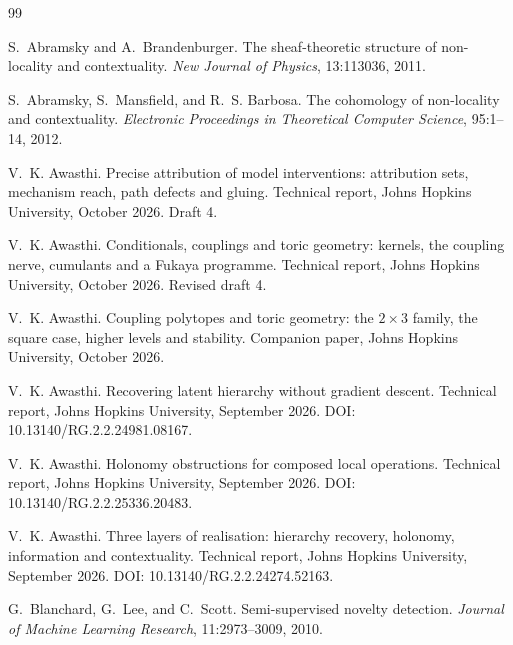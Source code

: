 \documentclass[11pt]{article}
\theoremstyle{definition}
\theoremstyle{remark}
\begin{document}
\begin{thebibliography}{99}

S.~Abramsky and A.~Brandenburger.
\newblock The sheaf-theoretic structure of non-locality and contextuality.
\newblock \emph{New Journal of Physics}, 13:113036, 2011.

S.~Abramsky, S.~Mansfield, and R.~S. Barbosa.
\newblock The cohomology of non-locality and contextuality.
\newblock \emph{Electronic Proceedings in Theoretical Computer Science}, 95:1--14, 2012.

V.~K. Awasthi.
\newblock Precise attribution of model interventions: attribution sets, mechanism reach, path defects
and gluing.
\newblock Technical report, Johns Hopkins University, October 2026. Draft 4.

V.~K. Awasthi.
\newblock Conditionals, couplings and toric geometry: kernels, the coupling nerve, cumulants and a {F}ukaya
programme.
\newblock Technical report, Johns Hopkins University, October 2026. Revised draft 4.

V.~K. Awasthi.
\newblock Coupling polytopes and toric geometry: the $2\times3$ family, the square case, higher levels and stability.
\newblock Companion paper, Johns Hopkins University, October 2026.

V.~K. Awasthi.
\newblock Recovering latent hierarchy without gradient descent.
\newblock Technical report, Johns Hopkins University, September 2026.
\newblock DOI: 10.13140/RG.2.2.24981.08167.

V.~K. Awasthi.
\newblock Holonomy obstructions for composed local operations.
\newblock Technical report, Johns Hopkins University, September 2026.
\newblock DOI: 10.13140/RG.2.2.25336.20483.

V.~K. Awasthi.
\newblock Three layers of realisation: hierarchy recovery, holonomy, information and contextuality.
\newblock Technical report, Johns Hopkins University, September 2026.
\newblock DOI: 10.13140/RG.2.2.24274.52163.

G.~Blanchard, G.~Lee, and C.~Scott.
\newblock Semi-supervised novelty detection.
\newblock \emph{Journal of Machine Learning Research}, 11:2973--3009, 2010.


\end{thebibliography}
\end{document}
